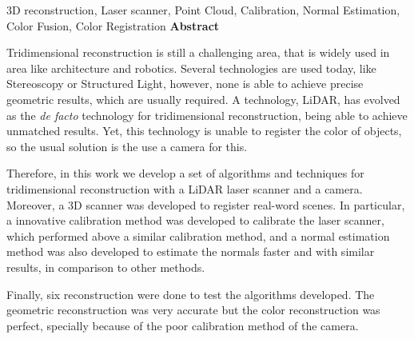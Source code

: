 

\TitlePage
\vspace*{55mm}
    {3D reconstruction, Laser scanner, Point Cloud, Calibration, Normal Estimation, Color Fusion, Color Registration}
\vspace*{15mm}
\TEXT
    {\textbf{Abstract}}
    {
    Tridimensional reconstruction is still a challenging area, that is widely used in area like architecture and robotics. Several technologies are used today, like Stereoscopy or Structured Light, however, none is able to achieve precise geometric results, which are usually required. A technology, LiDAR, has evolved as the \textit{de facto} technology for tridimensional reconstruction, being able to achieve unmatched results. Yet, this technology is unable to register the color of objects, so the usual solution is the use a camera for this.

    Therefore, in this work we develop a set of algorithms and techniques for tridimensional reconstruction with a LiDAR laser scanner and a camera. Moreover, a 3D scanner was developed to register real-word scenes. In particular, a innovative calibration method was developed to calibrate the laser scanner, which performed above a similar calibration method, and a normal estimation method was also developed to estimate the normals faster and with similar results, in comparison to other methods. 

    Finally, six reconstruction were done to test the algorithms developed. The geometric reconstruction was very accurate but the color reconstruction was perfect, specially because of the poor calibration method of the camera.
    }
\EndTitlePage
\titlepage\ \endtitlepage
